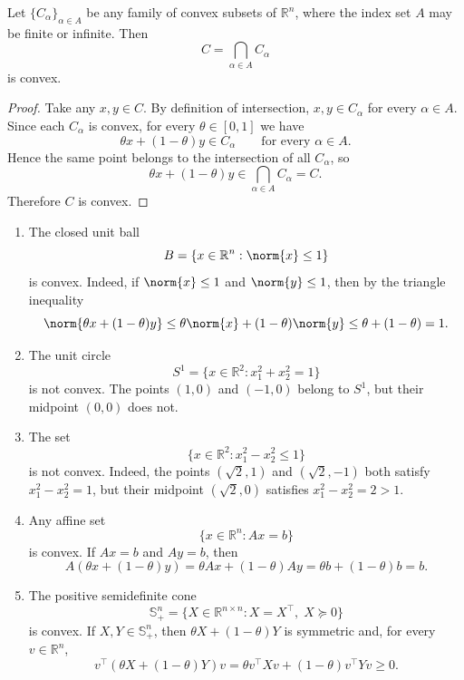 \begin{proposition}\label{prop:l1-intersection-of-convex-sets}
	Let $\{C_\alpha\}_{\alpha \in A}$ be any family of convex subsets of $\mathbb{R}^n$, where the index set $A$ may be finite or infinite. Then
	\[
		C = \bigcap_{\alpha \in A} C_\alpha
	\]
	is convex.
\end{proposition}
\begin{proof}
	Take any $x,y \in C$. By definition of intersection, $x,y \in C_\alpha$ for every $\alpha \in A$. Since each $C_\alpha$ is convex, for every $\theta \in [0,1]$ we have
	\[
		\theta x + (1-\theta)y \in C_\alpha
		\qquad \text{for every } \alpha \in A.
	\]
	Hence the same point belongs to the intersection of all $C_\alpha$, so
	\[
		\theta x + (1-\theta)y \in \bigcap_{\alpha \in A} C_\alpha = C.
	\]
	Therefore $C$ is convex.
\end{proof}

\begin{eg}
	\begin{enumerate}[label=(\alph*)]
		\item The closed unit ball
		      \[
			      B = \{x \in \mathbb{R}^n : \norm{x} \le 1\}
		      \]
		      is convex. Indeed, if $\norm{x} \le 1$ and $\norm{y} \le 1$, then by the triangle inequality
		      \[
			      \norm{\theta x + (1-\theta)y}
			      \le \theta \norm{x} + (1-\theta)\norm{y}
			      \le \theta + (1-\theta) = 1.
		      \]

		\item The unit circle
		      \[
			      S^1 = \{x \in \mathbb{R}^2 : x_1^2 + x_2^2 = 1\}
		      \]
		      is not convex. The points $(1,0)$ and $(-1,0)$ belong to $S^1$, but their midpoint $(0,0)$ does not.

		\item The set
		      \[
			      \{x \in \mathbb{R}^2 : x_1^2 - x_2^2 \le 1\}
		      \]
		      is not convex. Indeed, the points $(\sqrt{2},1)$ and $(\sqrt{2},-1)$ both satisfy $x_1^2 - x_2^2 = 1$, but their midpoint $(\sqrt{2},0)$ satisfies $x_1^2 - x_2^2 = 2 > 1$.

		\item Any affine set
		      \[
			      \{x \in \mathbb{R}^n : Ax = b\}
		      \]
		      is convex. If $Ax=b$ and $Ay=b$, then
		      \[
			      A(\theta x + (1-\theta)y) = \theta Ax + (1-\theta)Ay = \theta b + (1-\theta)b = b.
		      \]

		\item The positive semidefinite cone
		      \[
			      \mathbb{S}_+^n = \{X \in \mathbb{R}^{n \times n} : X = X^\top,\; X \succeq 0\}
		      \]
		      is convex. If $X,Y \in \mathbb{S}_+^n$, then $\theta X + (1-\theta)Y$ is symmetric and, for every $v \in \mathbb{R}^n$,
		      \[
			      v^\top (\theta X + (1-\theta)Y)v
			      = \theta v^\top X v + (1-\theta)v^\top Y v \ge 0.
		      \]
	\end{enumerate}
\end{eg}

